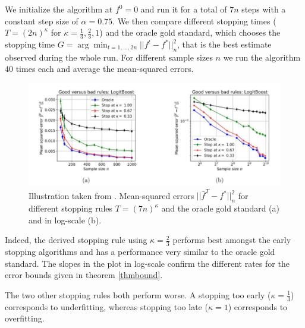 We initialize the algorithm at $f^0=0$ and run it for a total of $7n$ steps with a constant step size of $\alpha=0.75$. We then compare different stopping times ($T=(2n)^{\kappa}$ for $\kappa=\frac{1}{3},\frac{2}{3},1$) and the oracle gold standard, which chooses the stopping time $G=\operatorname{arg}\min_{t=1,...,2n}||f^t-f^*||_n^2$, that is the best estimate observed during the whole run. For different sample sizes $n$ we run the algorithm 40 times each and average the mean-squared errors.

\begin{figure}
  \includegraphics[width=\textwidth]{img/early_stopping_logit_plot.jpg}
  \caption{Illustration taken from \cite{wei2017early}. Mean-squared errors $||\bar{f}^T-f^*||_n^2$ for different stopping rules $T=(7n)^{\kappa}$ and the oracle gold standard (a) and in log-scale (b).}
  \label{l2boost}
\end{figure}

Indeed, the derived stopping rule using $\kappa=\frac{2}{3}$ performs best amongst the early stopping algorithms and has a performance very similar to the oracle gold standard. The slopes in the plot in log-scale confirm the different rates for the error bounds given in theorem \ref{thmbound}.

The two other stopping rules both perform worse. A stopping too early ($\kappa=\frac{1}{3}$) corresponds to underfitting, whereas stopping too late ($\kappa=1$) corresponds to overfitting.

